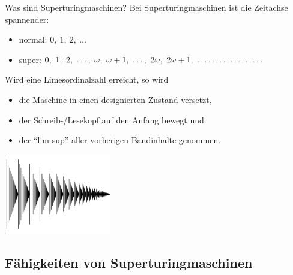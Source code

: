 \documentclass[12pt,compress,ngerman,utf8,t]{beamer}
\renewcommand{\_}{\mathpunct{.}\,}
\begin{document}
\begin{frame}{Was sind Superturingmaschinen?}
  Bei Superturingmaschinen ist die Zeitachse spannender:
  \begin{itemize}
    \item normal: $0,\ 1,\ 2,\ \ldots$
    \item super:\phantom{rl} $0,\ 1,\ 2,\ \ldots,\ \omega,\ \omega + 1,\ \ldots,\ 2\omega,\ 2\omega
    + 1,\ \makebox[\widthof{R}][l]{$\ldots\ldots\ldots\ldots\ldots\ldots$}$
  \end{itemize}
  \bigskip

  Wird eine Limesordinalzahl erreicht, so wird
  \begin{itemize}
    \item die Maschine in einen designierten Zustand versetzt,
    \item der Schreib-/Lesekopf auf den Anfang bewegt und
    \item der "`lim sup"' aller vorherigen Bandinhalte genommen.
  \end{itemize}

  \begin{center}
    \includegraphics[width=0.35\textwidth]{images/ordinal-omega-squared}
  \end{center}
\end{frame}


\subsection[Fähigkeiten]{Fähigkeiten von Superturingmaschinen}
\end{document}
